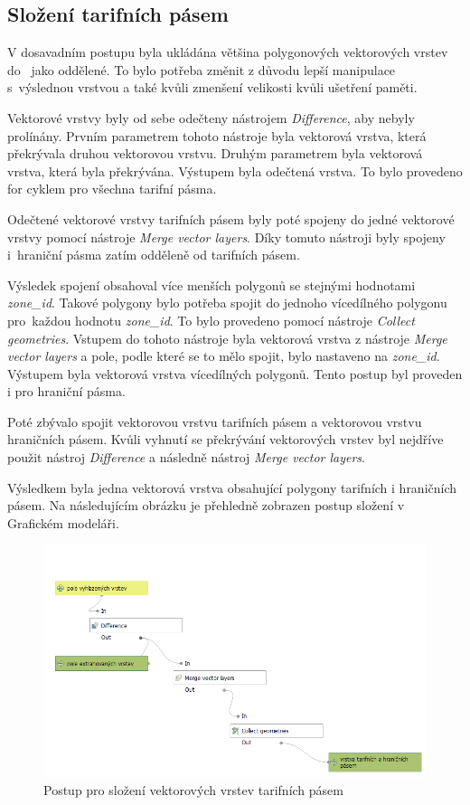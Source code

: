 \subsection{Složení tarifních pásem}
\label{seskupeni}

V dosavadním postupu byla ukládána většina polygonových vektorových vrstev do~ jako oddělené.
To bylo potřeba změnit z důvodu lepší manipulace s~výslednou vrstvou a také kvůli zmenšení velikosti 
kvůli ušetření paměti.

Vektorové vrstvy byly od sebe odečteny nástrojem \textit{Difference}, aby nebyly prolínány. 
Prvním parametrem tohoto nástroje byla vektorová vrstva, která překrývala druhou vektorovou vrstvu. 
Druhým parametrem byla vektorová vrstva, která byla překrývána. Výstupem byla odečtená vrstva.
To bylo provedeno for cyklem pro všechna tarifní pásma.

Odečtené vektorové vrstvy tarifních pásem byly poté spojeny do jedné vektorové vrstvy pomocí 
nástroje \textit{Merge vector layers}. Díky tomuto nástroji byly spojeny i~hraniční pásma zatím odděleně od tarifních pásem.

Výsledek spojení obsahoval více menších polygonů se stejnými hodnotami \textit{zone\-\_id}.
Takové polygony bylo potřeba spojit do jednoho vícedílného polygonu pro~každou hodnotu \textit{zone\_id}.
To bylo provedeno pomocí nástroje \textit{Collect geometries}. Vstupem do tohoto nástroje byla vektorová vrstva z 
nástroje \textit{Merge vector layers} a pole, podle které se to mělo spojit, bylo nastaveno na \textit{zone\_id}.
Výstupem byla vektorová vrstva vícedílných polygonů. Tento postup byl proveden i pro hraniční pásma.

Poté zbývalo spojit vektorovou vrstvu tarifních pásem a vektorovou vrstvu hra\-ničních pásem. Kvůli vyhnutí se 
překrývání vektorových vrstev byl nejdříve použit nástroj \textit{Difference} a následně nástroj  \textit{Merge vector layers}.

Výsledkem byla jedna vektorová vrstva obsahující polygony tarifních i hraničních pásem. Na následujícím obrázku
je přehledně zobrazen postup složení v Grafickém modeláři.

\begin{figure}[H] \centering
    \includegraphics[width=350pt]{./pictures/postup-collecting.png}
    \caption[Postup pro složení vektorových vrstev tarifních pásem]{Postup pro složení vektorových vrstev tarifních pásem}
	\label{fig:postup-collecting}              
\end{figure}

